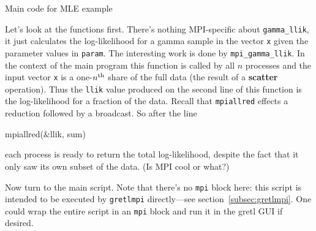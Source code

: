 \documentclass{article}
\begin{document}
\begin{script}[htbp]
  \caption{Main code for MLE example}
  \label{script:gamma}
\end{script}

Let's look at the functions first. There's nothing MPI-specific about
\verb|gamma_llik|, it just calculates the log-likelihood for a gamma
sample in the vector \texttt{x} given the parameter values in
\texttt{param}. The interesting work is done by
\verb|mpi_gamma_llik|. In the context of the main program this
function is called by all $n$ processes and the input vector
\texttt{x} is a one-$n^{\rm th}$ share of the full data (the result of
a \textbf{scatter} operation). Thus the \texttt{llik} value produced
on the second line of this function is the log-likelihood for a
fraction of the data. Recall that \texttt{mpiallred} effects a
reduction followed by a broadcast. So after the line
\begin{code}
mpiallred(&llik, sum)
\end{code}
each process is ready to return the total log-likelihood, despite the
fact that it only saw its own subset of the data. (Is MPI cool or
what?)

Now turn to the main script. Note that there's no \texttt{mpi} block
here: this script is intended to be executed by \texttt{gretlmpi}
directly---see section~\ref{subsec:gretlmpi}. One could wrap the
entire script in an \texttt{mpi} block and run it in the gretl GUI if
desired.
\end{document}
